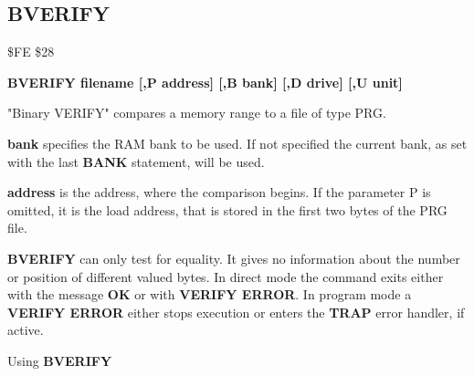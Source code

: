 \newpage
\subsection{BVERIFY}
\begin{description}[leftmargin=3cm,style=nextline]
\item [Token:] \$FE \$28
\item [Format:] {\bf BVERIFY filename [,P address]
                [,B bank] [,D drive] [,U unit] }
\item [Usage:]
   "Binary VERIFY" compares a memory range to
   a file of type PRG.

   \filenamedefinition

   {\bf bank} specifies the RAM bank to be used.
   If not specified the current bank, as set with the last
   {\bf BANK} statement, will be used.

   {\bf address} is the address, where the comparison begins.
   If the parameter P is omitted, it is the load address,
   that is stored in the first two bytes of the PRG file.

   \drivedefinition

   \unitdefinition

\item [Remarks:]
   {\bf BVERIFY} can only test for equality. It gives no information
   about the number or position of different valued bytes.
   In direct mode the command exits either with the message {\bf OK}
   or with {\bf VERIFY ERROR}. In program mode a {\bf VERIFY ERROR}
   either stops execution or enters the {\bf TRAP} error handler,
   if active.

\item [Example:] Using {\bf BVERIFY}
\end{description}


\newpage
